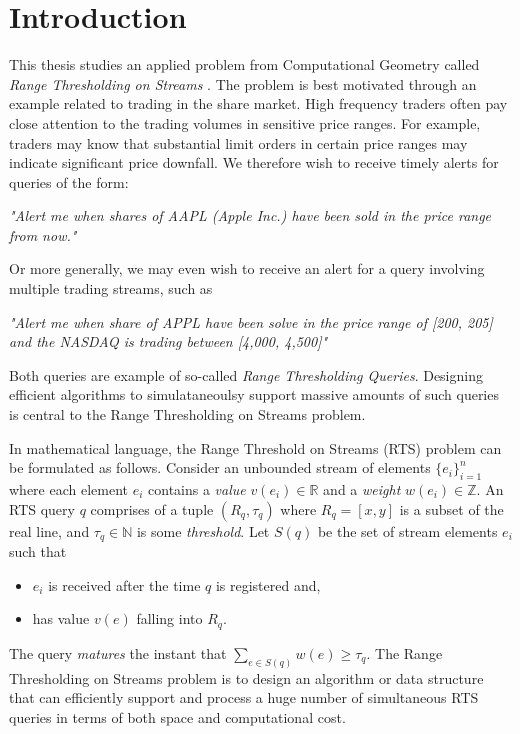\clearpage

\def\chaptertitle{Introduction}

\lhead{\emph{\chaptertitle}}

\chapter{\chaptertitle}
\label{ch:introduction}

This thesis studies an applied problem from Computational Geometry called \textit{Range Thresholding on Streams} \cite{GAN16}. The problem is best motivated through an example related to trading in the share market. High frequency traders often pay close attention to the trading volumes in sensitive price ranges. For example, traders may know that substantial limit orders in certain price ranges may indicate significant price downfall. We therefore wish to receive timely alerts for queries of the form: 

\textit{"Alert me when  shares of AAPL (Apple Inc.) have been sold in the price range \text{[200, 205]} from now."}

Or more generally, we may even wish to receive an alert for a query involving multiple trading streams, such as 

\textit{"Alert me when  share of APPL have been solve in the price range of [200, 205] and the NASDAQ is trading between [4,000, 4,500]"}

Both queries are example of so-called \textit{Range Thresholding Queries}. Designing efficient algorithms to simulataneoulsy support massive amounts of such queries is central to the Range Thresholding on Streams problem. 

In mathematical language, the Range Threshold on Streams (RTS) problem can be formulated as follows. Consider an unbounded stream of elements $\{e_i\}^{n}_{i=1}$ where each element $e_i$ contains a \textit{value} $v(e_i) \in \mathbb{R}$ and a \textit{weight} $w(e_i) \in \mathbb{Z}$. An RTS query $q$ comprises of a tuple $(R_q, \tau_q)$ where $R_q = [x,y]$ is a subset of the real line, and $\tau_q \in\mathbb{N}$ is some \textit{threshold}. Let $S(q)$ be the set of stream elements $e_i$ such that 
\begin{itemize}
    \item $e_i$ is received after the time $q$ is registered and,
    \item has value $v(e)$ falling into $R_q$. 
\end{itemize}
The query \textit{matures} the instant that $\sum_{e\in S(q)}w(e)\geq \tau_q$. The Range Thresholding on Streams problem is to design an algorithm or data structure that can efficiently support and process a huge number of simultaneous RTS queries  in terms of both space and computational cost. 

